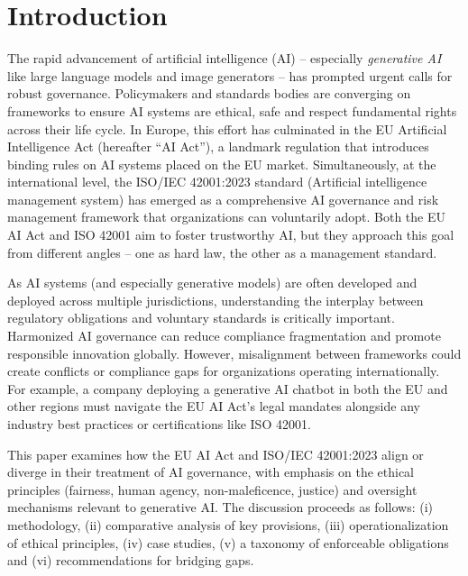 \documentclass{article}
\begin{document}
\section{Introduction}
The rapid advancement of artificial intelligence (AI) – especially \emph{generative AI} like large language models and image generators – has prompted urgent calls for robust governance. Policymakers and standards bodies are converging on frameworks to ensure AI systems are ethical, safe and respect fundamental rights across their life cycle. In Europe, this effort has culminated in the EU Artificial Intelligence Act (hereafter “AI Act”), a landmark regulation that introduces binding rules on AI systems placed on the EU market. Simultaneously, at the international level, the ISO/IEC 42001:2023 standard (Artificial intelligence management system) has emerged as a comprehensive AI governance and risk management framework that organizations can voluntarily adopt. Both the EU AI Act and ISO 42001 aim to foster trustworthy AI, but they approach this goal from different angles – one as hard law, the other as a management standard.

As AI systems (and especially generative models) are often developed and deployed across multiple jurisdictions, understanding the interplay between regulatory obligations and voluntary standards is critically important. Harmonized AI governance can reduce compliance fragmentation and promote responsible innovation globally. However, misalignment between frameworks could create conflicts or compliance gaps for organizations operating internationally. For example, a company deploying a generative AI chatbot in both the EU and other regions must navigate the EU AI Act’s legal mandates alongside any industry best practices or certifications like ISO 42001.

This paper examines how the EU AI Act and ISO/IEC 42001:2023 align or diverge in their treatment of AI governance, with emphasis on the ethical principles (fairness, human agency, non-maleficence, justice) and oversight mechanisms relevant to generative AI. The discussion proceeds as follows: (i) methodology, (ii) comparative analysis of key provisions, (iii) operationalization of ethical principles, (iv) case studies, (v) a taxonomy of enforceable obligations and (vi) recommendations for bridging gaps.

\end{document}
